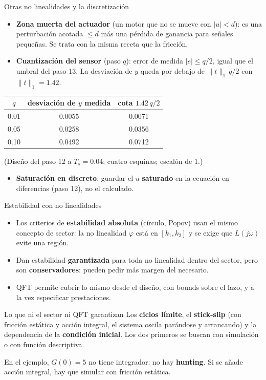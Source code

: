 \documentclass[aspectratio=169,11pt]{beamer}
\begin{document}
\begin{frame}{Otras no linealidades y la discretización}
  \small
  \begin{itemize}
    \item \textbf{Zona muerta del actuador} (un motor que no se mueve con $|u|<d$): es una perturbación acotada $\le d$ más una pérdida de ganancia para señales pequeñas. Se trata con la misma receta que la fricción.
    \item \textbf{Cuantización del sensor} (paso $q$): error de medida $|e|\le q/2$, igual que el umbral del paso 13. La desviación de $y$ queda por debajo de $\|t\|_1\,q/2$ con $\|t\|_1=1.42$.
  \end{itemize}
  \begin{center}
  \footnotesize
  \begin{tabular}{c|c|c}
    $q$ & desviación de $y$ medida & cota $1.42\,q/2$\\\hline
    0.01 & 0.0055 & 0.0071\\
    0.05 & 0.0258 & 0.0356\\
    0.10 & 0.0492 & 0.0712
  \end{tabular}
  \end{center}
  \footnotesize
  (Diseño del paso 12 a $T_s=0.04$; cuatro esquinas; escalón de $1$.)
  \begin{itemize}
    \item \textbf{Saturación en discreto}: guardar el $u$ \textbf{saturado} en la ecuación en diferencias (paso 12), no el calculado.
  \end{itemize}
\end{frame}

\begin{frame}{Estabilidad con no linealidades}
  \small
  \begin{itemize}
    \item Los criterios de \textbf{estabilidad absoluta} (círculo, Popov) usan el mismo concepto de sector: la no linealidad $\varphi$ está en $[k_1,k_2]$ y se exige que $L(j\omega)$ evite una región.
    \item Dan estabilidad \textbf{garantizada} para toda no linealidad dentro del sector, pero son \textbf{conservadores}: pueden pedir más margen del necesario.
    \item QFT permite cubrir lo mismo desde el diseño, con bounds sobre el lazo, y a la vez especificar prestaciones.
  \end{itemize}
  \begin{alertblock}{Lo que ni el sector ni QFT garantizan}
    Los \textbf{ciclos límite}, el \textbf{stick-slip} (con fricción estática y acción integral, el sistema oscila parándose y arrancando) y la dependencia de la \textbf{condición inicial}. Los dos primeros se buscan con simulación o con función descriptiva.
  \end{alertblock}
  En el ejemplo, $G(0)=5$ no tiene integrador: no hay \textbf{hunting}. Si se añade acción integral, hay que simular con fricción estática.
\end{frame}
\end{document}
